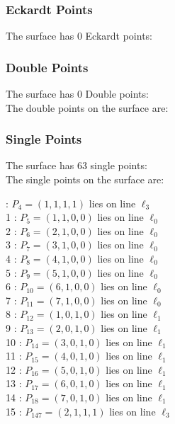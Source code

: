 \documentclass{article}
\begin{document}
{\subsubsection*{Eckardt Points}
The surface has 0 Eckardt points:\\
\subsubsection*{Double Points}
The surface has 0 Double points:\\
The double points on the surface are:\\
\begin{multicols}{2}
\noindent
\end{multicols}
\subsubsection*{Single Points}
The surface has 63 single points:\\
The single points on the surface are:\\
\begin{multicols}{2}
 : $P_{4}=( 1, 1, 1, 1 )$ lies on line $\ell_{3}$\\
1 : $P_{5}=( 1, 1, 0, 0 )$ lies on line $\ell_{0}$\\
2 : $P_{6}=( 2, 1, 0, 0 )$ lies on line $\ell_{0}$\\
3 : $P_{7}=( 3, 1, 0, 0 )$ lies on line $\ell_{0}$\\
4 : $P_{8}=( 4, 1, 0, 0 )$ lies on line $\ell_{0}$\\
5 : $P_{9}=( 5, 1, 0, 0 )$ lies on line $\ell_{0}$\\
6 : $P_{10}=( 6, 1, 0, 0 )$ lies on line $\ell_{0}$\\
7 : $P_{11}=( 7, 1, 0, 0 )$ lies on line $\ell_{0}$\\
8 : $P_{12}=( 1, 0, 1, 0 )$ lies on line $\ell_{1}$\\
9 : $P_{13}=( 2, 0, 1, 0 )$ lies on line $\ell_{1}$\\
10 : $P_{14}=( 3, 0, 1, 0 )$ lies on line $\ell_{1}$\\
11 : $P_{15}=( 4, 0, 1, 0 )$ lies on line $\ell_{1}$\\
12 : $P_{16}=( 5, 0, 1, 0 )$ lies on line $\ell_{1}$\\
13 : $P_{17}=( 6, 0, 1, 0 )$ lies on line $\ell_{1}$\\
14 : $P_{18}=( 7, 0, 1, 0 )$ lies on line $\ell_{1}$\\
15 : $P_{147}=( 2, 1, 1, 1 )$ lies on line $\ell_{3}$\\

\end{multicols}}
\end{document}
